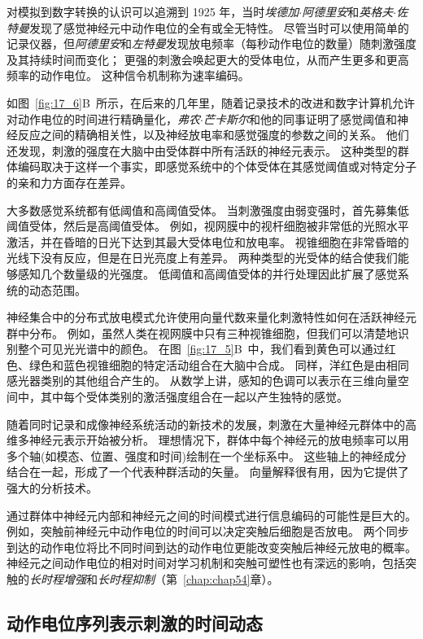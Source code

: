 对模拟到数字转换的认识可以追溯到 1925 年，当时\textit{埃德加$\cdot$阿德里安}和\textit{英格夫$\cdot$佐特曼}发现了感觉神经元中动作电位的全有或全无特性。 
尽管当时可以使用简单的记录仪器，但\textit{阿德里安}和\textit{左特曼}发现放电频率（每秒动作电位的数量）随刺激强度及其持续时间而变化； 
更强的刺激会唤起更大的受体电位，从而产生更多和更高频率的动作电位。 
这种信令机制称为速率编码。


如图~\ref{fig:17_6}B~所示，在后来的几年里，随着记录技术的改进和数字计算机允许对动作电位的时间进行精确量化，\textit{弗农$\cdot$芒卡斯尔}和他的同事证明了感觉阈值和神经反应之间的精确相关性，以及神经放电率和感觉强度的参数之间的关系。
他们还发现，刺激的强度在大脑中由受体群中所有活跃的神经元表示。
这种类型的群体编码取决于这样一个事实，即感觉系统中的个体受体在其感觉阈值或对特定分子的亲和力方面存在差异。


大多数感觉系统都有低阈值和高阈值受体。 
当刺激强度由弱变强时，首先募集低阈值受体，然后是高阈值受体。 
例如，视网膜中的视杆细胞被非常低的光照水平激活，并在昏暗的日光下达到其最大受体电位和放电率。 
视锥细胞在非常昏暗的光线下没有反应，但是在日光亮度上有差异。 
两种类型的光受体的结合使我们能够感知几个数量级的光强度。 
低阈值和高阈值受体的并行处理因此扩展了感觉系统的动态范围。


神经集合中的分布式放电模式允许使用向量代数来量化刺激特性如何在活跃神经元群中分布。 
例如，虽然人类在视网膜中只有三种视锥细胞，但我们可以清楚地识别整个可见光光谱中的颜色。 
在图~\ref{fig:17_5}B~中，我们看到黄色可以通过红色、绿色和蓝色视锥细胞的特定活动组合在大脑中合成。
同样，洋红色是由相同感光器类别的其他组合产生的。 
从数学上讲，感知的色调可以表示在三维向量空间中，其中每个受体类别的激活强度组合在一起以产生独特的感觉。


随着同时记录和成像神经系统活动的新技术的发展，刺激在大量神经元群体中的高维多神经元表示开始被分析。
理想情况下，群体中每个神经元的放电频率可以用多个轴(如模态、位置、强度和时间)绘制在一个坐标系中。
这些轴上的神经成分结合在一起，形成了一个代表种群活动的矢量。
向量解释很有用，因为它提供了强大的分析技术。


通过群体中神经元内部和神经元之间的时间模式进行信息编码的可能性是巨大的。
例如，突触前神经元中动作电位的时间可以决定突触后细胞是否放电。
两个同步到达的动作电位将比不同时间到达的动作电位更能改变突触后神经元放电的概率。
神经元之间动作电位的相对时间对学习机制和突触可塑性也有深远的影响，包括突触的\textit{长时程增强}和\textit{长时程抑制}（第~\ref{chap:chap54}章）。



\subsection{动作电位序列表示刺激的时间动态}

